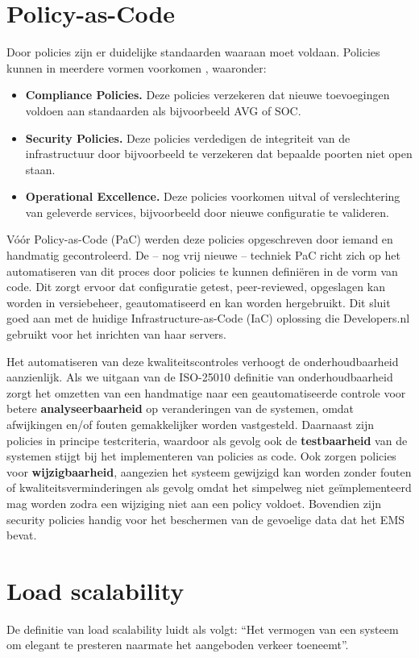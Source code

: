 \section{Policy-as-Code}
Door policies zijn er duidelijke standaarden waaraan moet voldaan. Policies kunnen in meerdere vormen voorkomen \parencite{WhyPaC}, waaronder:
\begin{itemize}
	\item \textbf{Compliance Policies.} Deze policies verzekeren dat nieuwe toevoegingen voldoen aan standaarden als bijvoorbeeld AVG of SOC.
	\item \textbf{Security Policies.} Deze policies verdedigen de integriteit van de infrastructuur door bijvoorbeeld te verzekeren dat bepaalde poorten niet open staan.
	\item \textbf{Operational Excellence.} Deze policies voorkomen uitval of verslechtering van geleverde services, bijvoorbeeld door nieuwe configuratie te valideren.
\end{itemize}

Vóór Policy-as-Code (PaC) werden deze policies opgeschreven door iemand en handmatig gecontroleerd. De -- nog vrij nieuwe -- techniek PaC richt zich op het automatiseren van dit proces door policies te kunnen definiëren in de vorm van code. Dit zorgt ervoor dat configuratie getest, peer-reviewed, opgeslagen kan worden in versiebeheer, geautomatiseerd en kan worden hergebruikt. Dit sluit goed aan met de huidige Infrastructure-as-Code (IaC) oplossing die Developers.nl gebruikt voor het inrichten van haar servers.

Het automatiseren van deze kwaliteitscontroles verhoogt de onderhoudbaarheid aanzienlijk. Als we uitgaan van de ISO-25010 definitie van onderhoudbaarheid \parencite{ISO25010} zorgt het omzetten van een handmatige naar een geautomatiseerde controle voor betere \textbf{analyseerbaarheid} op veranderingen van de systemen, omdat afwijkingen en/of fouten gemakkelijker worden vastgesteld. Daarnaast zijn policies in principe testcriteria, waardoor als gevolg ook de \textbf{testbaarheid} van de systemen stijgt bij het implementeren van policies as code. Ook zorgen policies voor \textbf{wijzigbaarheid}, aangezien het systeem gewijzigd kan worden zonder fouten of kwaliteitsverminderingen als gevolg omdat het simpelweg niet geïmplementeerd mag worden zodra een wijziging niet aan een policy voldoet. Bovendien zijn security policies handig voor het beschermen van de gevoelige data dat het EMS bevat.

\section{Load scalability}
De definitie van load scalability luidt als volgt: \enquote{Het vermogen van een systeem om elegant te presteren naarmate het aangeboden verkeer toeneemt}.

